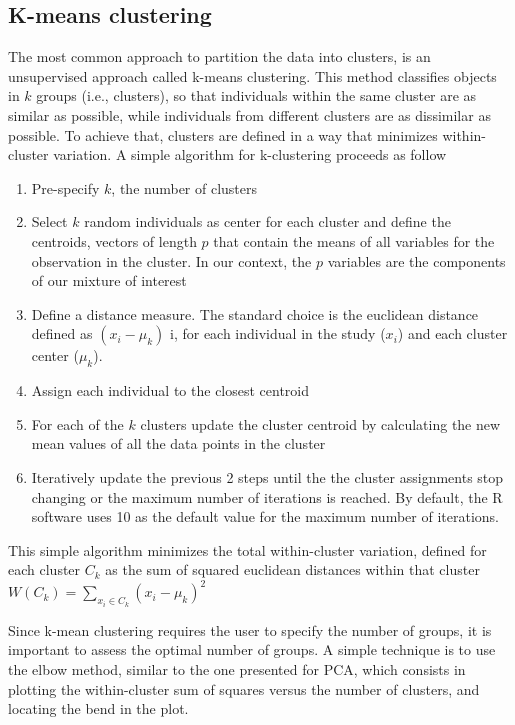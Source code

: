 \documentclass[
]{book}
\providecommand{\tightlist}{%
  \setlength{\itemsep}{0pt}\setlength{\parskip}{0pt}}
\begin{document}
\hypertarget{k-means-clustering}{%
\subsection{K-means clustering}\label{k-means-clustering}}

The most common approach to partition the data into clusters, is an unsupervised approach called k-means clustering. This method classifies objects in \(k\) groups (i.e., clusters), so that individuals within the same cluster are as similar as possible, while individuals from different clusters are as dissimilar as possible. To achieve that, clusters are defined in a way that minimizes within-cluster variation. A simple algorithm for k-clustering proceeds as follow

\begin{enumerate}
\def\labelenumi{\arabic{enumi}.}
\tightlist
\item
  Pre-specify \(k\), the number of clusters
\item
  Select \(k\) random individuals as center for each cluster and define the centroids, vectors of length \(p\) that contain the means of all variables for the observation in the cluster. In our context, the \(p\) variables are the components of our mixture of interest
\item
  Define a distance measure. The standard choice is the euclidean distance defined as \((x_i-\mu_k)\) i, for each individual in the study (\(x_i\)) and each cluster center (\(\mu_k\)).
\item
  Assign each individual to the closest centroid
\item
  For each of the \(k\) clusters update the cluster centroid by calculating the new mean values of all the data points in the cluster
\item
  Iteratively update the previous 2 steps until the the cluster assignments stop changing or the maximum number of iterations is reached. By default, the R software uses 10 as the default value for the maximum number of iterations.
\end{enumerate}

This simple algorithm minimizes the total within-cluster variation, defined for each cluster \(C_k\) as the sum of squared euclidean distances within that cluster \(W(C_k)=\sum_{x_i\in C_k}(x_i-\mu_k)^2\)

Since k-mean clustering requires the user to specify the number of groups, it is important to assess the optimal number of groups. A simple technique is to use the elbow method, similar to the one presented for PCA, which consists in plotting the within-cluster sum of squares versus the number of clusters, and locating the bend in the plot.
\end{document}
